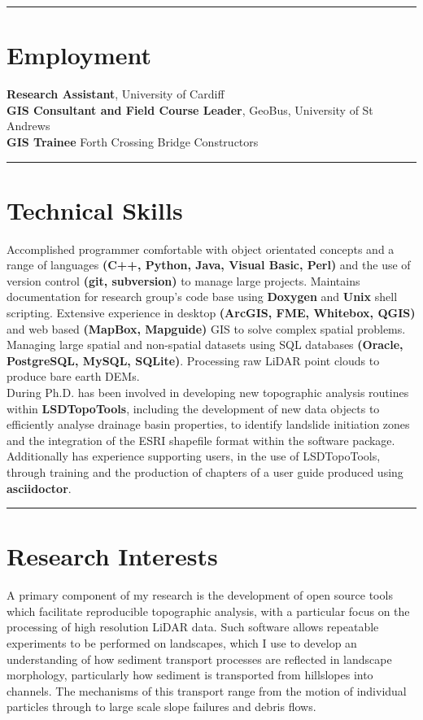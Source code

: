 \documentclass[10pt, a4paper]{article}
\newcommand{\years}[1]{\marginnote{\scriptsize #1}}
\begin{document}
\hrule
\section*{Employment}
\noindent

\years{2016} \textbf{Research Assistant}, University of Cardiff\\[0.05cm]
\years{2015} \textbf{GIS Consultant and Field Course Leader}, GeoBus, University of St Andrews\\[0.05cm]
\years{2012--2013} \textbf{GIS Trainee} Forth Crossing Bridge Constructors\\[0.05cm]

\hrule
\section*{Technical Skills}
\noindent

Accomplished programmer comfortable with object orientated concepts and a range of languages \textbf{(C++, Python, Java, Visual Basic, Perl)} and the use of version control \textbf{(git, subversion)} to manage large projects. Maintains documentation for research group’s code base using \textbf{Doxygen} and \textbf{Unix} shell scripting. Extensive experience in desktop \textbf{(ArcGIS, FME, Whitebox, QGIS)} and web based \textbf{(MapBox, Mapguide)} GIS to solve complex spatial problems. Managing large spatial and non-spatial datasets using SQL databases \textbf{(Oracle, PostgreSQL, MySQL, SQLite)}. Processing raw LiDAR point clouds to produce bare earth DEMs.\\[0.05cm]

During Ph.D. has been involved in developing new topographic analysis routines within \textbf{LSDTopoTools}, including the development of new data objects to efficiently analyse drainage basin properties, to identify landslide initiation zones and the integration of the ESRI shapefile format within the software package. Additionally has experience supporting users, in the use of LSDTopoTools, through training and the production of chapters of a user guide produced using \textbf{asciidoctor}.  \\[0.05cm]

\hrule
\section*{Research Interests}
\noindent

A primary component of my research is the development of open source tools which facilitate reproducible topographic analysis, with a particular focus on the processing of high resolution LiDAR data. Such software allows repeatable experiments to be performed on landscapes, which I use to develop an understanding of how sediment transport processes are reflected in landscape morphology, particularly how sediment is transported from hillslopes into channels. The mechanisms of this transport range from the motion of individual particles through to large scale slope failures and debris flows.\\[0.05cm]
\end{document}
